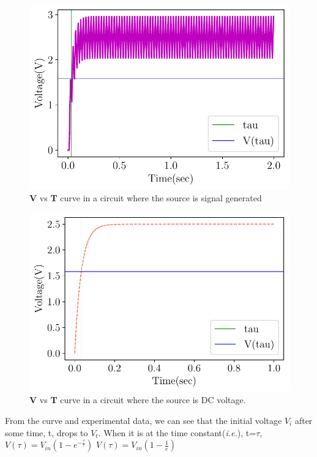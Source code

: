 \documentclass[twocolumn]{article}\usepackage[english]{babel}
\begin{document}
\begin{figure}
\includegraphics[width=\linewidth]{images/v2/Signal Generated RC Circuit Plot.pdf}
\caption{\textbf{V} vs \textbf{T} curve in a circuit where the source is signal generated }
  \label{fig:Signal RC Voltage}
\end{figure}

\begin{figure}
\includegraphics[width=\linewidth]{images/v2/RC Circuit Plot.pdf}
\caption{\textbf{V} vs \textbf{T} curve in a circuit where the source is DC voltage.  }
  \label{fig:DC RC Voltage}
\end{figure}

From the curve and experimental data, we can see that the initial voltage
$V_i$ after some time, t, drops to $V_t$. When it is at the time
constant(\textit{i.e.}), t=$\tau$, \newline \newline
\(V(\tau) = V_{in}\left(1 - e^{-\frac{\tau}{\tau}}\right)\) \newline
\(V(\tau) = V_{in}\left(1-\frac{1}{e}\right)\) \newline 
\end{document}
